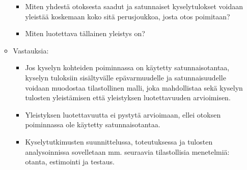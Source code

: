 \documentclass[
]{book}
\providecommand{\tightlist}{%
  \setlength{\itemsep}{0pt}\setlength{\parskip}{0pt}}
\begin{document}
\begin{itemize}
\begin{itemize}
    \begin{itemize}
    \tightlist
    \item
      Miten yhdestä otoksesta saadut ja satunnaiset kyselytulokset voidaan yleistää koskemaan koko sitä perusjoukkoa, josta otos poimitaan?
    \item
      Miten luotettava tällainen yleistys on?
    \end{itemize}
  \item
    Vastauksia:

    \begin{itemize}
    \tightlist
    \item
      Jos kyselyn kohteiden poiminnassa on käytetty satunnaisotantaa, kyselyn tuloksiin sisältyvälle epävarmuudelle ja satunnaisuudelle voidaan muodostaa tilastollinen malli, joka mahdollistaa sekä kyselyn tulosten yleistämisen että yleistyksen luotettavuuden arvioimisen.
    \item
      Yleistyksen luotettavuutta ei pystytä arvioimaan, ellei otoksen poiminnassa ole käytetty satunnaisotantaa.
    \item
      Kyselytutkimusten suunnittelussa, toteutuksessa ja tulosten analysoinnissa sovelletaan mm. seuraavia tilastollisia menetelmiä: otanta, estimointi ja testaus.
    \end{itemize}
  \end{itemize}
\end{itemize}

\newpage
\end{document}
